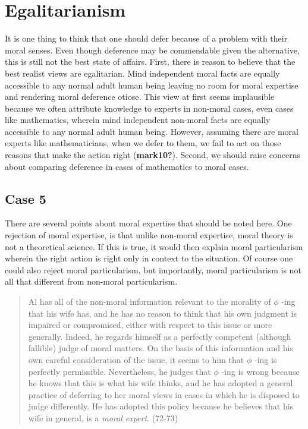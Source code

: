 \documentclass[12pt]{book}
\theoremstyle{definition}
\theoremstyle{remark}
\begin{document}
\section{Egalitarianism}\label{egalitarianism}

It is one thing to think that one should defer because of a problem with their moral senses. Even though deference may be commendable given the alternative, this is still not the best state of affairs. First, there is reason to believe that the best realist views are egalitarian. Mind independent moral facts are equally accessible to any normal adult human being leaving no room for moral expertise and rendering moral deference otiose. This view at first seems implausible because we often attribute knowledge to experts in non-moral cases, even cases like mathematics, wherein mind independent non-moral facts are equally accessible to any normal adult human being. However, assuming there are moral experts like mathematicians, when we defer to them, we fail to act on those reasons that make the action right (\textbf{mark10?}). Second, we should raise concerns about comparing deference in cases of mathematics to moral cases.

\subsection*{Case 5}\label{case-5}

There are several points about moral expertise that should be noted here. One rejection of moral expertise, is that unlike non-moral expertise, moral theory is not a theoretical science. If this is true, it would then explain moral particularism wherein the right action is right only in context to the situation. Of course one could also reject moral particularism, but importantly, moral particularism is not all that different from non-moral particularism.

\begin{quote}
Al has all of the non-moral information relevant to the morality of \(\phi\) -ing that his wife has, and he has no reason to think that his own judgment is impaired or compromised, either with respect to this issue or more generally. Indeed, he regards himself as a perfectly competent (although fallible) judge of moral matters. On the basis of this information and his own careful consideration of the issue, it seems to him that \(\phi\) -ing is perfectly permissible. Nevertheless, he judges that \(\phi\) -ing is wrong because he knows that this is what his wife thinks, and he has adopted a general practice of deferring to her moral views in cases in which he is disposed to judge differently. He has adopted this policy because he believes that his wife in general, is a \emph{moral expert}. (72-73)
\end{quote}
\end{document}
